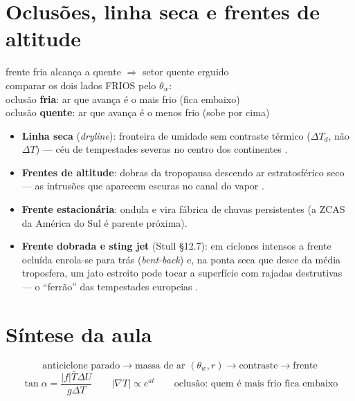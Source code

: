 \documentclass[11pt]{article}
\begin{document}
\section{Oclusões, linha seca e frentes de altitude}\label{sec:oclusao}

\begin{noquadro}[oclusão (T5)]
frente fria alcança a quente $\Rightarrow$ setor quente erguido\\
comparar os dois lados FRIOS pelo $\theta_w$:\\
oclusão \textbf{fria}: ar que avança é o mais frio (fica embaixo)\\
oclusão \textbf{quente}: ar que avança é o menos frio (sobe por cima)
\end{noquadro}

\begin{itemize}
  \item \textbf{Linha seca} (\emph{dryline}): fronteira de umidade sem
        contraste térmico ($\Delta T_d$, não $\Delta T$) — céu de
        tempestades severas no centro dos continentes
        .
  \item \textbf{Frentes de altitude}: dobras da tropopausa
         descendo ar estratosférico seco — as
        intrusões que aparecem escuras no canal do vapor
        .
  \item \textbf{Frente estacionária}: ondula e vira fábrica de chuvas
        persistentes (a ZCAS da América do Sul é parente próxima).
  \item \textbf{Frente dobrada e sting jet} (Stull \S12.7): em
        ciclones intensos a frente ocluída enrola-se para trás
        (\emph{bent-back}) e, na ponta seca que desce da média
        troposfera, um jato estreito pode tocar a superfície com
        rajadas destrutivas — o ``ferrão'' das tempestades europeias
        .
\end{itemize}

\section{Síntese da aula}

\begin{noquadro}
\[ \text{anticiclone parado} \to \text{massa de ar } (\theta_w, r)
\to \text{contraste} \to \text{frente} \]
\[ \tan\alpha = \frac{|f|\bar T\Delta U}{g\Delta T} \qquad
|\nabla T| \propto e^{at} \qquad \text{oclusão: quem é mais frio fica
embaixo} \]
\end{noquadro}
\end{document}

